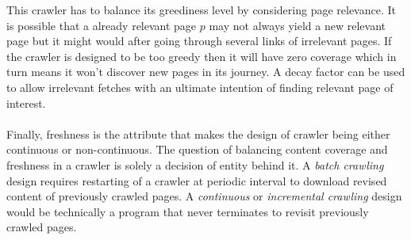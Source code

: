 \noindent
This crawler has to balance its greediness level by considering page relevance. It is possible that a
already relevant page $p$ may not always yield a new relevant page but it might would after going through
several links of irrelevant pages. If the crawler is designed to be too greedy then it will have zero
coverage which in turn means it won't discover new pages in its journey. A decay factor can be used to
allow irrelevant fetches with an ultimate intention of finding relevant page of interest.
\\
\\
Finally, freshness is the attribute that makes the design of crawler being either continuous or non-continuous. The question of balancing content coverage and freshness in a crawler is solely a decision of entity behind it. A \textit{batch crawling}\cite{trends} design requires restarting of a crawler at periodic interval to download revised content of previously crawled pages. A \textit{continuous} or \textit{incremental crawling}\cite{trends} design
would be technically a program that never terminates to revisit previously crawled pages.


